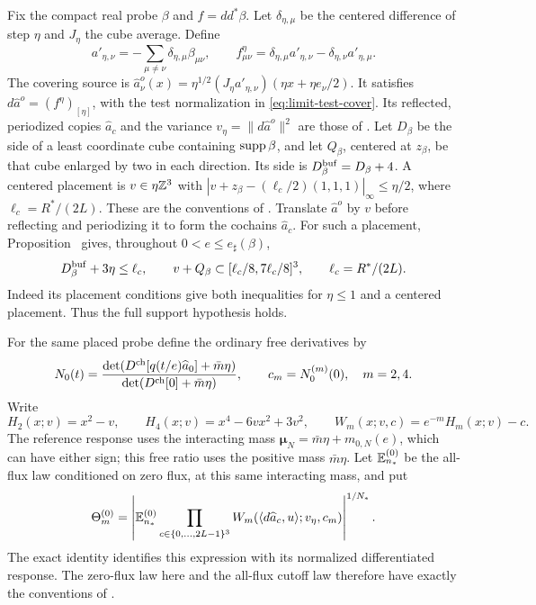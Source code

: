 Fix the compact real probe $\beta$ and $f=dd^*\beta$.
Let $\delta_{\eta,\mu}$ be the centered difference of step
$\eta$ and $J_\eta$ the cube average. Define
\[
 a'_{\eta,\nu}=-\sum_{\mu\ne\nu}\delta_{\eta,\mu}\beta_{\mu\nu},
 \qquad
 f^\eta_{\mu\nu}=\delta_{\eta,\mu}a'_{\eta,\nu}
                       -\delta_{\eta,\nu}a'_{\eta,\mu}.
\]
The covering source is
$\widehat a^o_\nu(x)=\eta^{1/2}(J_\eta a'_{\eta,\nu})(\eta x+\eta e_\nu/2)$.
It satisfies $d\widehat a^o=(f^\eta)_{[\eta]}$, with the
test normalization in \eqref{eq:limit-test-cover}.
Its reflected, periodized copies $\widehat a_c$ and the
variance $v_\eta=\|d\widehat a^o\|^2$ are those of
\cite[Section~2]{ReferenceResponse}.
Let $D_\beta$ be the side of a least coordinate cube containing
$\operatorname{supp}\beta$, and let $Q_\beta$, centered at $z_\beta$, be
that cube enlarged by two in each direction. Its side is
$D_\beta^{\rm buf}=D_\beta+4$. A centered placement is
$v\in\eta\mathbb Z^3$ with
$|v+z_\beta-(\ell_c/2)(1,1,1)|_\infty\le\eta/2$,
where $\ell_c=R^*/(2L)$. These are the conventions of
\cite[Section~2]{ReferenceResponse}. Translate $\widehat a^o$
by $v$ before reflecting and periodizing it to form the cochains
$\widehat a_c$. For such a placement,
Proposition~ gives, throughout
$0<e\le e_\sharp(\beta)$,
\[
 D_\beta^{\rm buf}+3\eta\le\ell_c,
 \qquad v+Q_\beta\subset[\ell_c/8,7\ell_c/8]^3,
 \qquad \ell_c=R^*/(2L).
\]
Indeed its placement conditions 
give both inequalities for $\eta\le1$ and a centered placement.
Thus the full support hypothesis  holds.

For the same placed probe define the ordinary free derivatives by
\[
 N_0(t)=\frac{\det(D^{\rm ch}[q(t/e)\widehat a_0]+\bar m\eta)}
                   {\det(D^{\rm ch}[0]+\bar m\eta)},
 \qquad c_m=N_0^{(m)}(0),\quad m=2,4.
\]
Write
\[
 H_2(x;v)=x^2-v,\qquad H_4(x;v)=x^4-6vx^2+3v^2,
 \qquad W_m(x;v,c)=e^{-m}H_m(x;v)-c.
\]
The reference response uses the interacting mass
$\boldsymbol\mu_N=\bar m\eta+m_{0,N}(e)$, which can have
either sign; this free ratio uses the positive mass $\bar m\eta$.
Let $\mathbb E_{n_*}^{(0)}$ be the all-flux law conditioned on zero
flux, at this same interacting mass, and put
\[
 \Theta_m^{(0)}=
 \left|\mathbb E_{n_*}^{(0)}\prod_{c\in\{0,\ldots,2L-1\}^3}
 W_m(\langle d\widehat a_c,u\rangle;v_\eta,c_m)\right|^{1/N_*}.
\]
The exact identity  identifies
this expression with its normalized differentiated response.
The zero-flux law here and the all-flux cutoff law therefore
have exactly the conventions of \cite{VolumeTransfer}.

